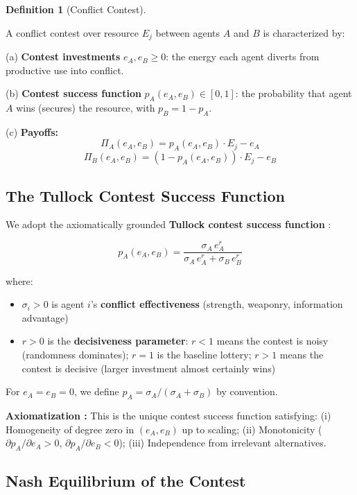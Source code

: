 \documentclass[11pt]{article}
\theoremstyle{plain}
\theoremstyle{definition}
\newtheorem{definition}{Definition}
\theoremstyle{remark}
\let\origsubsection\subsection
\renewcommand{\subsection}{\needspace{7\baselineskip}\origsubsection}
\providecommand{\tightlist}{%
  \setlength{\itemsep}{0pt}\setlength{\parskip}{0pt}}
\begin{document}
\begin{definition}[Conflict Contest]
\label{def-conflict-contest}

A conflict contest over resource $E_j$ between agents $A$ and $B$ is characterized by:

(a) \textbf{Contest investments} $e_A, e_B \geq 0$: the energy each agent diverts from productive use into conflict.

(b) \textbf{Contest success function} $p_A(e_A, e_B) \in [0, 1]$: the probability that agent $A$ wins (secures) the resource, with $p_B = 1 - p_A$.

(c) \textbf{Payoffs:}
$$\Pi_A(e_A, e_B) = p_A(e_A, e_B) \cdot E_j - e_A$$
$$\Pi_B(e_A, e_B) = (1 - p_A(e_A, e_B)) \cdot E_j - e_B$$
\end{definition}

\subsection{The Tullock Contest Success
Function}\label{the-tullock-contest-success-function}

We adopt the axiomatically grounded \textbf{Tullock contest success
function} \citep{Skaperdas1996}:

\[p_A(e_A, e_B) = \frac{\sigma_A \, e_A^r}{\sigma_A \, e_A^r + \sigma_B \, e_B^r}\]

where:

\begin{itemize}
\tightlist
\item
  \(\sigma_i > 0\) is agent \(i\)'s \textbf{conflict effectiveness}
  (strength, weaponry, information advantage)
\item
  \(r > 0\) is the \textbf{decisiveness parameter}: \(r < 1\) means the
  contest is noisy (randomness dominates); \(r = 1\) is the baseline
  lottery; \(r > 1\) means the contest is decisive (larger investment
  almost certainly wins)
\end{itemize}

For \(e_A = e_B = 0\), we define
\(p_A = \sigma_A / (\sigma_A + \sigma_B)\) by convention.

\textbf{Axiomatization \citep{Skaperdas1996}:} This is the unique
contest success function satisfying: (i) Homogeneity of degree zero in
\((e_A, e_B)\) up to scaling; (ii) Monotonicity
(\(\partial p_A / \partial e_A > 0\),
\(\partial p_A / \partial e_B < 0\)); (iii) Independence from irrelevant
alternatives.

\subsection{Nash Equilibrium of the
Contest}\label{nash-equilibrium-of-the-contest}
\end{document}
